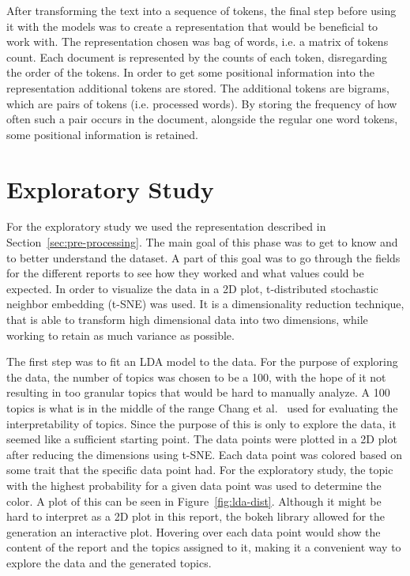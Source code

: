 After transforming the text into a sequence of tokens, the final step before using it with the models was to create a representation that would be beneficial to work with.
The representation chosen was bag of words, i.e. a matrix of tokens count.
Each document is represented by the counts of each token, disregarding the order of the tokens.
In order to get some positional information into the representation additional tokens are stored. 
The additional tokens are bigrams, which are pairs of tokens (i.e. processed words).
By storing the frequency of how often such a pair occurs in the document, alongside the regular one word tokens, some positional information is retained.

\section{Exploratory Study}\label{sec:exploratory-study}
For the exploratory study we used the representation described in Section~\ref{sec:pre-processing}.
The main goal of this phase was to get to know and to better understand the dataset.
A part of this goal was to go through the fields for the different reports to see how they worked and what values could be expected.
In order to visualize the data in a 2D plot, t-distributed stochastic neighbor embedding (t-SNE) was used.
It is a dimensionality reduction technique, that is able to transform high dimensional data into two dimensions, while working to retain as much variance as possible.

The first step was to fit an LDA model to the data.
For the purpose of exploring the data, the number of topics was chosen to be a 100, with the hope of it not resulting in too granular topics that would be hard to manually analyze.
A 100 topics is what is in the middle of the range Chang et al\@.~\cite{chang2009reading} used for evaluating the interpretability of topics.
Since the purpose of this is only to explore the data, it seemed like a sufficient starting point.
The data points were plotted in a 2D plot after reducing the dimensions using t-SNE.
Each data point was colored based on some trait that the specific data point had.
For the exploratory study, the topic with the highest probability for a given data point was used to determine the color.
A plot of this can be seen in Figure~\ref{fig:lda-dist}.
Although it might be hard to interpret as a 2D plot in this report, the bokeh library allowed for the generation an interactive plot.
Hovering over each data point would show the content of the report and the topics assigned to it, making it a convenient way to explore the data and the generated topics.


